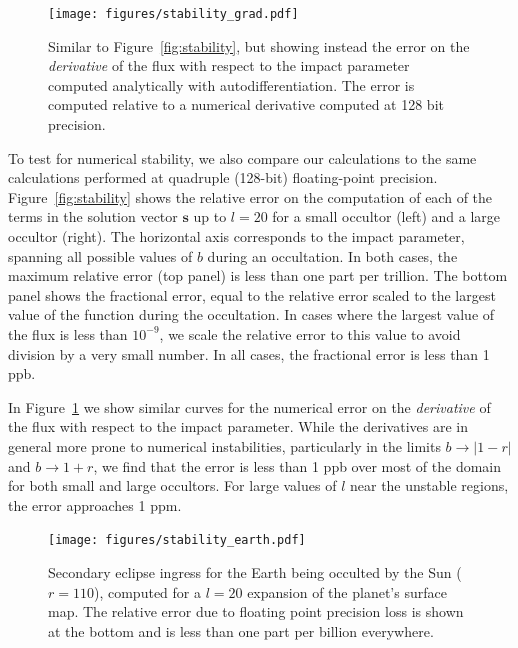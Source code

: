 \documentclass[modern]{aastex61}
\begin{document}
\begin{figure}[p!]
    \begin{centering}
    \texttt{[image: figures/stability\_grad.pdf]}
    \caption{\label{fig:stability_grad}
             Similar to Figure~\ref{fig:stability}, but showing instead the
             error on the \emph{derivative} of the flux with respect to the impact
             parameter computed analytically with autodifferentiation. The error is computed
             relative to a numerical derivative computed at 128 bit precision.
             }
    \end{centering}
\end{figure}

To test for numerical stability, we also compare our calculations to
the same calculations performed at quadruple (128-bit) floating-point precision.
Figure~\ref{fig:stability} shows the relative error on the computation of each of the
terms in the solution vector $\mathbf{s}$ up to $l = 20$ for a small occultor (left)
and a large occultor (right). The horizontal axis corresponds to the impact
parameter, spanning all possible values of $b$ during an occultation.
In both cases, the maximum relative error (top panel) is less than one part per
trillion. The bottom panel shows the fractional error, equal to the relative
error scaled to the largest value of the function during the occultation. In cases
where the largest value of the flux is less than $10^{-9}$, we scale the relative
error to this value to avoid division by a very small number. In all cases, the
fractional error is less than 1 ppb.

In Figure~\ref{fig:stability_grad} we show similar curves for the numerical error
on the \emph{derivative} of the flux with respect to the impact parameter. While
the derivatives are in general more prone to numerical instabilities, particularly in the
limits $b \rightarrow |1 - r|$ and $b \rightarrow 1 + r$, we find that the error
is less than 1 ppb over most of the domain for both small and large occultors. For
large values of $l$ near the unstable regions, the error approaches 1 ppm.

\begin{figure}[ht!]
    \begin{centering}
    \texttt{[image: figures/stability\_earth.pdf]}
    \caption{\label{fig:stability_earth}
             Secondary eclipse ingress for the Earth being occulted by the Sun
             ($r = 110$), computed for a $l = 20$ expansion of the planet's
             surface map. The relative error due to floating point precision loss
             is shown at the bottom and is
             less than one part per billion everywhere.
             }
    \end{centering}
\end{figure}
\end{document}
